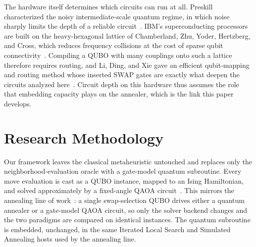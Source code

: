 \documentclass{svproc}
\begin{document}
The hardware itself determines which circuits can run at all. Preskill
characterized the noisy intermediate-scale quantum regime, in which noise
sharply limits the depth of a reliable circuit~\cite{preskill2018}. IBM's
superconducting processors are built on the heavy-hexagonal lattice of
Chamberland, Zhu, Yoder, Hertzberg, and Cross, which reduces frequency
collisions at the cost of sparse qubit connectivity~\cite{chamberland2020}.
Compiling a QUBO with many couplings onto such a lattice therefore
requires routing, and Li, Ding, and Xie gave an efficient qubit-mapping
and routing method whose inserted SWAP gates are exactly what deepen the
circuits analyzed here~\cite{li2019}. Circuit depth on this hardware thus
assumes the role that embedding capacity plays on the annealer, which is
the link this paper develops.

\section{Research Methodology}
\label{sec:method}

Our framework leaves the classical metaheuristic untouched and replaces
only the neighborhood-evaluation oracle with a gate-model quantum
subroutine. Every move evaluation is cast as a QUBO instance, mapped to
an Ising Hamiltonian, and solved approximately by a fixed-angle QAOA
circuit~\cite{farhi2014qaoa}. This mirrors the annealing line of
work~\cite{wojewodzki2026bpasts,wojewodzki2026windowed}: a single
swap-selection QUBO drives either a quantum annealer or a gate-model
QAOA circuit, so only the solver backend changes and the two paradigms
are compared on identical instances. The quantum subroutine is embedded,
unchanged, in the same Iterated Local Search and Simulated Annealing
hosts used by the annealing line.
\end{document}
